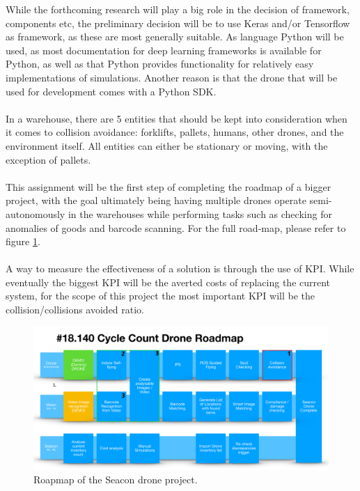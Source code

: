 \noindent
While the forthcoming research will play a big role in the decision of framework, components etc, the preliminary decision will be to use Keras and/or Tensorflow as framework, as these are most generally suitable. As language Python will be used, as most documentation for deep learning frameworks is available for Python, as well as that Python provides functionality for relatively easy implementations of simulations. Another reason is that the drone that will be used for development comes with a Python SDK. \\\\
\noindent
In a warehouse, there are 5 entities that should be kept into consideration when it comes to collision avoidance: forklifts, pallets, humans, other drones, and the environment itself. All entities can either be stationary or moving, with the exception of pallets. \\\\
\noindent
This assignment will be the first step of completing the roadmap of a bigger project, with the goal ultimately being having multiple drones operate semi-autonomously in the warehouses while performing tasks such as checking for anomalies of goods and barcode scanning. For the full road-map, please refer to figure \ref{fig:roadmap}. \\\\
\noindent
A way to measure the effectiveness of a solution is through the use of \gls{KPI}. While eventually the biggest \gls{KPI} will be the averted costs of replacing the current system, for the scope of this project the most important \gls{KPI} will be the collision/collisions avoided ratio. 
\pagebreak
\begin{figure}[h]
	\centering
	\includegraphics[width=\linewidth]{"img/seacon_roadmap"}
	\caption{Roapmap of the Seacon drone project.}
	\label{fig:roadmap}
\end{figure}

